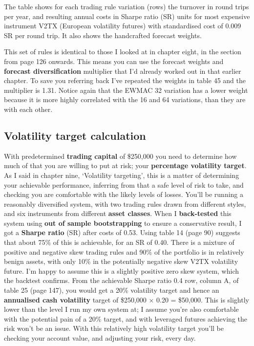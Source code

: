 The table shows for each trading rule variation (rows) the turnover in round trips per year, and resulting annual costs in Sharpe ratio (SR) units for most expensive instrument V2TX (European volatility futures) with standardised cost of 0.009 SR per round trip. It also shows the handcrafted forecast weights.

This set of rules is identical to those I looked at in chapter eight, in the section from page 126 onwards. This means you can use the forecast weights and \textbf{forecast diversification} multiplier that I'd already worked out in that earlier chapter. To save you referring back I've repeated the weights in table 45 and the multiplier is 1.31. Notice again that the EWMAC 32 variation has a lower weight because it is more highly correlated with the 16 and 64 variations, than they are with each other.

\subsection*{Volatility target calculation}

With predetermined \textbf{trading capital} of \$250,000 you need to determine how much of that you are willing to put at risk; your \textbf{percentage volatility target}. As I said in chapter nine, ‘Volatility targeting', this is a matter of determining your achievable performance, inferring from that a safe level of risk to take, and checking you are comfortable with the likely levels of losses. You'll be running a reasonably diversified system, with two trading rules drawn from different styles, and six instruments from different \textbf{asset classes}. When I \textbf{back-tested} this system using \textbf{out of sample bootstrapping} to ensure a conservative result, I got a \textbf{Sharpe ratio} (SR) after costs of 0.53. Using table 14 (page 90) suggests that about 75\% of this is achievable, for an SR of 0.40. There is a mixture of positive and negative skew trading rules and 90\% of the portfolio is in relatively benign assets, with only 10\% in the potentially negative skew V2TX volatility future. I'm happy to assume this is a slightly positive zero skew system, which the backtest confirms. From the achievable Sharpe ratio 0.4 row, column A, of table 25 (page 147), you would get a 20\% volatility target and hence an \textbf{annualised cash volatility} target of \$250,000 × 0.20 = \$50,000. This is slightly lower than the level I run my own system at; I assume you're also comfortable with the potential pain of a 20\% target, and with leveraged futures achieving the risk won't be an issue. With this relatively high volatility target you'll be checking your account value, and adjusting your risk, every day.


